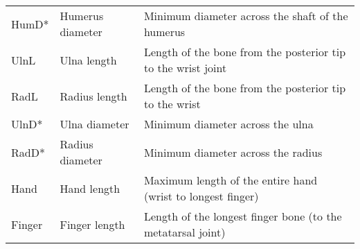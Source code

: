 \begin{tabular}{lp{3.5cm}p{9.75cm}}
HumD* & Humerus diameter & Minimum diameter across the shaft of the humerus \\
UlnL & Ulna length & Length of the bone from the posterior tip to the wrist joint \\
RadL & Radius length & Length of the bone from the posterior tip to the wrist \\
UlnD* & Ulna diameter & Minimum diameter across the ulna \\
RadD* & Radius diameter & Minimum diameter across the radius \\
Hand & Hand length & Maximum length of the entire hand (wrist to longest finger) \\
Finger & Finger length & Length of the longest finger bone (to the metatarsal joint) \\
\hline

\end{tabular}